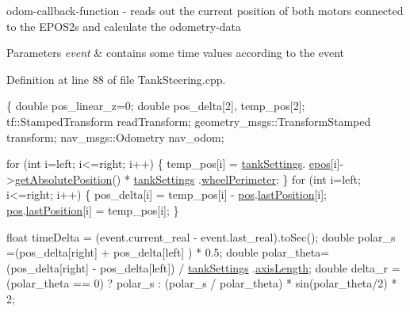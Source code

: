 odom-\/callback-\/function -\/ reads out the current position of both motors connected to the E\-P\-O\-S2s and calculate the odometry-\/data 


\begin{DoxyParams}{Parameters}
{\em event} & contains some time values according to the event \\
\hline
\end{DoxyParams}


Definition at line 88 of file Tank\-Steering.\-cpp.


\begin{DoxyCode}
\{
    \textcolor{keywordtype}{double} pos\_linear\_z=0;
    \textcolor{keywordtype}{double} pos\_delta[2], temp\_pos[2];
    tf::StampedTransform readTransform;
    geometry\_msgs::TransformStamped transform;
    nav\_msgs::Odometry nav\_odom;

    \textcolor{keywordflow}{for} (\textcolor{keywordtype}{int} i=left; i<=right; i++) \{ temp\_pos[i] = \hyperlink{classTankSteering_a6973af1afc00c9b11f32ecc7ad7e8a14}{tankSettings}.
      \hyperlink{structTankSteering_1_1tankSet_a0c1ff021afbf7602a5593ca973b25246}{epos}[i]->\hyperlink{classEpos2MotorController_a07b5def07609a91cba8a1977f6436c0a}{getAbsolutePosition}() * \hyperlink{classTankSteering_a6973af1afc00c9b11f32ecc7ad7e8a14}{tankSettings}
      .\hyperlink{structTankSteering_1_1tankSet_a6876c0ad344c0baf2f63fbe8da846af1}{wheelPerimeter}; \}
    \textcolor{keywordflow}{for} (\textcolor{keywordtype}{int} i=left; i<=right; i++) \{
        pos\_delta[i] = temp\_pos[i] - \hyperlink{classTankSteering_ae08d9f507d6de01a86f59aa135283abc}{pos}.\hyperlink{structTankSteering_1_1odom_a25a805ceeca36f85c91baaec605616d5}{lastPosition}[i];
        \hyperlink{classTankSteering_ae08d9f507d6de01a86f59aa135283abc}{pos}.\hyperlink{structTankSteering_1_1odom_a25a805ceeca36f85c91baaec605616d5}{lastPosition}[i] = temp\_pos[i];
    \}

    \textcolor{keywordtype}{float} timeDelta = (\textcolor{keyword}{event}.current\_real - \textcolor{keyword}{event}.last\_real).toSec();
    \textcolor{keywordtype}{double} polar\_s  =(pos\_delta[right] + pos\_delta[left] ) * 0.5;
    \textcolor{keywordtype}{double} polar\_theta=(pos\_delta[right] - pos\_delta[left]) / \hyperlink{classTankSteering_a6973af1afc00c9b11f32ecc7ad7e8a14}{tankSettings}
      .\hyperlink{structTankSteering_1_1tankSet_a546f41c6c1e7d0ba11e7a096c41d52cd}{axisLength};
    \textcolor{keywordtype}{double} delta\_r = (polar\_theta == 0) ? polar\_s : (polar\_s / polar\_theta) * 
      sin(polar\_theta/2) * 2;


\end{DoxyCode}
